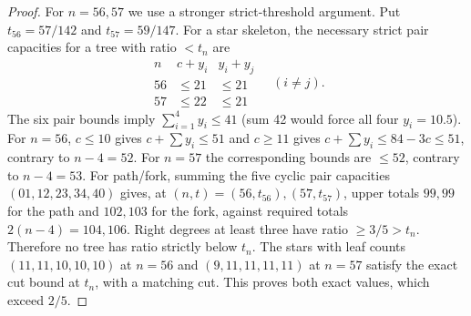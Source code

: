 \documentclass[11pt,a4paper]{article}
\begin{document}
\begin{proof}
For $n=56,57$ we use a stronger strict-threshold argument. Put $t_{56}=57/142$ and $t_{57}=59/147$. For a star skeleton, the necessary strict pair capacities for a tree with ratio $<t_n$ are
\[
\begin{array}{c|cc}
n&c+y_i&y_i+y_j\\\hline
56&\le21&\le21\\57&\le22&\le21
\end{array}
\quad(i\ne j).
\]
The six pair bounds imply $\sum_{i=1}^4y_i\le41$ (sum 42 would force all four $y_i=10.5$). For $n=56$, $c\le10$ gives $c+\sum y_i\le51$ and $c\ge11$ gives $c+\sum y_i\le84-3c\le51$, contrary to $n-4=52$. For $n=57$ the corresponding bounds are $\le52$, contrary to $n-4=53$. For path/fork, summing the five cyclic pair capacities $(01,12,23,34,40)$ gives, at $(n,t)=(56,t_{56}),(57,t_{57})$, upper totals $99,99$ for the path and $102,103$ for the fork, against required totals $2(n-4)=104,106$. Right degrees at least three have ratio $\ge3/5>t_n$. Therefore no tree has ratio strictly below $t_n$. The stars with leaf counts $(11,11,10,10,10)$ at $n=56$ and $(9,11,11,11,11)$ at $n=57$ satisfy the exact cut bound at $t_n$, with a matching cut. This proves both exact values, which exceed $2/5$.\end{proof}
\end{document}
